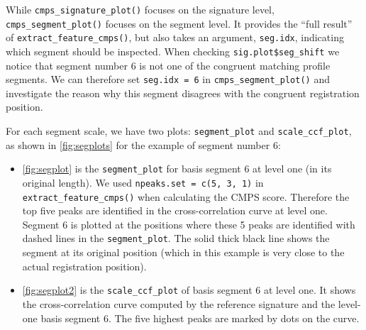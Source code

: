 While \texttt{cmps\_signature\_plot()} focuses on the signature level,
\texttt{cmps\_segment\_plot()} focuses on the segment level. It provides
the ``full result'' of \texttt{extract\_feature\_cmps()}, but also takes
an argument, \texttt{seg.idx}, indicating which segment should be
inspected. When checking \texttt{sig.plot\$seg\_shift} we notice that
segment number 6 is not one of the congruent matching profile segments.
We can therefore set \texttt{seg.idx\ =\ 6} in
\texttt{cmps\_segment\_plot()} and investigate the reason why this
segment disagrees with the congruent registration position.

For each segment scale, we have two plots: \texttt{segment\_plot} and
\texttt{scale\_ccf\_plot}, as shown in \autoref{fig:segplots} for the
example of segment number 6:

\begin{itemize}
\tightlist
\item
  \autoref{fig:segplot} is the \texttt{segment\_plot} for basis segment
  6 at level one (in its original length). We used
  \texttt{npeaks.set\ =\ c(5,\ 3,\ 1)} in
  \texttt{extract\_feature\_cmps()} when calculating the CMPS score.
  Therefore the top five peaks are identified in the cross-correlation
  curve at level one. Segment 6 is plotted at the positions where these
  5 peaks are identified with dashed lines in the
  \texttt{segment\_plot}. The solid thick black line shows the segment
  at its original position (which in this example is very close to the
  actual registration position).
\item
  \autoref{fig:segplot2} is the \texttt{scale\_ccf\_plot} of basis
  segment 6 at level one. It shows the cross-correlation curve computed
  by the reference signature and the level-one basis segment 6. The five
  highest peaks are marked by dots on the curve.
\end{itemize}

